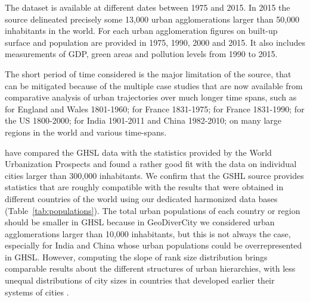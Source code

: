 \documentclass[11pt]{article}
\begin{document}
The dataset is available at different dates between 1975 and 2015. In 2015 the source delineated precisely some 13,000 urban agglomerations larger than 50,000 inhabitants in the world. For each urban agglomeration figures on built-up surface and population are provided in 1975, 1990, 2000 and 2015. It also includes measurements of GDP, green areas and pollution levels from 1990 to 2015. 

The short period of time considered is the major limitation of the source, that can be mitigated because of the multiple case studies that are now available from comparative analysis of urban trajectories over much longer time spans, such as \cite{robson1973view} for England and Wales 1801-1960; \cite{pumain1982dynamique} for France 1831-1975; \cite{bretagnolle1999systemes} for France 1831-1990; \cite{bretagnolle2007formes} for the US 1800-2000; \cite{swerts2013systemes} for India 1901-2011 and China 1982-2010; \cite{rozenblat2018international} on many large regions in the world and various time-spans.

\cite{dijkstra2018applying} have compared the GHSL data with the statistics provided by the World Urbanization Prospects \cite{desa2018world} and found a rather good fit with the data on individual cities larger than 300,000 inhabitants. We confirm that the GSHL source provides statistics that are roughly compatible with the results that were obtained in different countries of the world using our dedicated harmonized data bases (Table~\ref{tab:populations}). The total urban populations of each country or region should be smaller in GHSL because in GeoDiverCity we considered urban agglomerations larger than 10,000 inhabitants, but this is not always the case, especially for India and China whose urban populations could be overrepresented in GHSL. However, computing the slope of rank size distribution brings comparable results about the different structures of urban hierarchies, with less unequal distributions of city sizes in countries that developed earlier their systems of cities \cite{pumain2015multilevel}.
\end{document}
